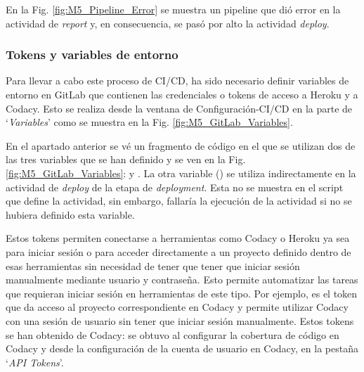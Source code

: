  
 En la Fig. \ref{fig:M5_Pipeline_Error} se muestra un pipeline que dió error en la actividad de \textit{report} y, en consecuencia, se pasó por alto la actividad \textit{deploy}.
 

\subsubsection{Tokens y variables de entorno}

Para llevar a cabo este proceso de CI/CD, ha sido necesario definir variables de entorno en GitLab que contienen las credenciales o tokens de acceso a Heroku y a Codacy. Esto se realiza desde la ventana de Configuración-CI/CD en la parte de `\textit{Variables}' como se muestra en la Fig. \ref{fig:M5_GitLab_Variables}.


En el apartado anterior se vé un fragmento de código en el que se utilizan dos de las tres variables que se han definido y se ven en la Fig. \ref{fig:M5_GitLab_Variables}:  y . La otra variable () se utiliza indirectamente en la actividad de \textit{deploy} de la etapa de \textit{deployment}. Esta no se muestra en el script que define la actividad, sin embargo, fallaría la ejecución de la actividad si no se hubiera definido esta variable.

Estos tokens permiten conectarse a herramientas como Codacy o Heroku ya sea para iniciar sesión o para acceder directamente a un proyecto definido dentro de esas herramientas sin necesidad de tener que tener que iniciar sesión manualmente mediante usuario y contraseña. Esto permite automatizar las tareas que requieran iniciar sesión en herramientas de este tipo. Por ejemplo,  es el token que da acceso al proyecto correspondiente en Codacy y  permite utilizar Codacy con una sesión de usuario sin tener que iniciar sesión manualmente. Estos tokens se han obtenido de Codacy:  se obtuvo al configurar la cobertura de código en Codacy y  desde la configuración de la cuenta de usuario en Codacy, en la pestaña `\textit{API Tokens}'.

